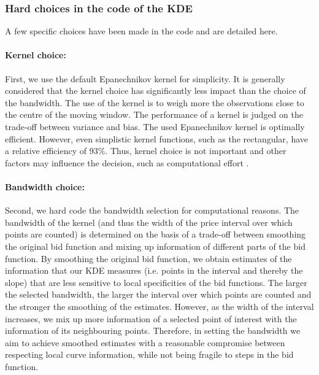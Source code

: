 \begin{subappendices}
\subsubsection{Hard choices in the code of the KDE}
\label{hardcodechoices}
A few specific choices have been made in the code and are detailed here. 
\paragraph{Kernel choice:}
First, we use the default Epanechnikov kernel for simplicity. It is generally considered that the kernel choice has significantly less impact than the choice of the bandwidth. The use of the kernel is to weigh more the observations close to the centre of the moving window. The performance of a kernel is judged on the trade-off between variance and bias. The used Epanechnikov kernel is optimally efficient. However, even simplistic kernel functions, such as the rectangular, have a relative efficiency of $93\%$. Thus, kernel choice is not important and other factors may influence the decision, such as computational effort \cite{salgado1994exploring, silverman1986density}. 

\paragraph{Bandwidth choice:}
Second, we hard code the bandwidth selection for computational reasons. The bandwidth of the kernel (and thus the width of the price interval over which points are counted) is determined on the basis of a trade-off between 
smoothing the original bid function and mixing up information of different parts of the bid function. By smoothing the original bid function, we obtain estimates of the information that our KDE measures (i.e. points in the interval and thereby the slope) that are less sensitive to local specificities of the bid functions. The larger the selected bandwidth, the larger the interval over which points are counted and  the stronger the smoothing of the estimates. However, as the width of the interval increases, we mix up more information of a selected point of interest with the information of its neighbouring points. Therefore, in setting the bandwidth we aim to achieve smoothed estimates  with a reasonable compromise between respecting local curve information, while not being fragile to steps in the bid function. \\



\end{subappendices}

